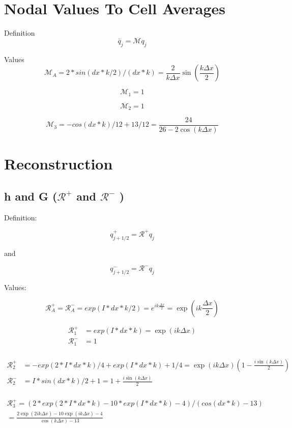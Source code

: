\documentclass[12pt]{article}
\begin{document}
\section{Nodal Values To Cell Averages}
Definition
\[\bar{q}_j = \mathcal{M} q_j\]

Values
\[\mathcal{M}_A = 2*sin(dx*k/2)/(dx*k) = \frac{2}{k \Delta x } \sin\left(\frac{k\Delta x}{2}\right)\]

\[\mathcal{M}_1 = 1\]

\[\mathcal{M}_2 = 1\]

\[\mathcal{M}_3 = -cos(dx*k)/12 + 13/12 =  \frac{24}{26 - 2 \cos\left(k \Delta x\right)}\]

\section{Reconstruction}


\subsection{h and G ($\mathcal{R^+}$ and $\mathcal{R^-}$ )}

Definition:

\[q^+_{j+1/2} = \mathcal{R}^+ q_j\]

and

\[q^-_{j+1/2} = \mathcal{R}^- q_j\]

Values:

\[\mathcal{R}^+_A = \mathcal{R}^-_A = exp(I*dx*k/2) = e^{i k \frac{\Delta x}{2}} = \exp\left(i k \frac{\Delta x}{2}\right)\]

\begin{align*}
\mathcal{R}^+_1 &= exp(I*dx*k) = \exp\left(i k {\Delta x}\right) \\
\mathcal{R}^-_1 &= 1  \\
\end{align*}

\begin{align*}
\mathcal{R}^+_2 &= -exp(2*I*dx*k)/4 + exp(I*dx*k) + 1/4 = \exp\left(i k {\Delta x}\right) \left(1 - \frac{i \sin\left(k\Delta x \right)}{2} \right)  \\
\mathcal{R}^-_2 &= I*sin(dx*k)/2 + 1 =1 +  \frac{i \sin\left(k\Delta x \right)}{2}  \\
\end{align*}

\begin{multline}
\mathcal{R}^+_3 = (2*exp(2*I*dx*k) - 10*exp(I*dx*k) - 4)/(cos(dx*k) - 13)\\  =  \frac{2\exp\left(2ik \Delta x\right) - 10\exp\left(ik \Delta x\right) - 4}{\cos\left(k \Delta x\right) - 13}
\end{multline}
\end{document}
